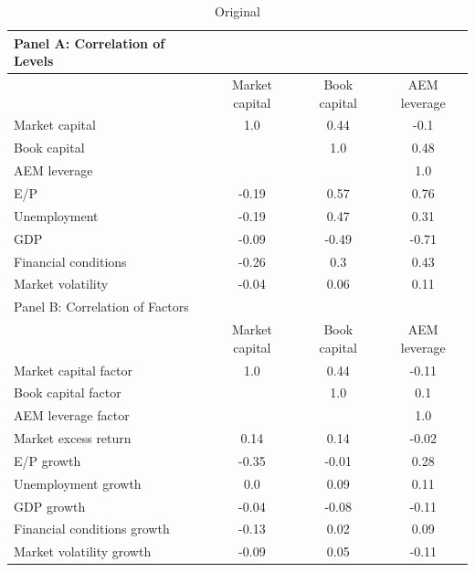 \documentclass{article}
\begin{document}
\clearpage


    \begin{table}[htbp]
    \centering
    \caption{\label{tab:correlation}Original}
    \begin{adjustbox}{max width=\textwidth}
    \small
    \begin{tabular}{lccc}
        \toprule
        Panel A: Correlation of Levels \\
        \midrule
         & Market capital & Book capital & AEM leverage \\
        \midrule
        Market capital & 1.0 & 0.44 & -0.1 \\
Book capital &  & 1.0 & 0.48 \\
AEM leverage &  &  & 1.0 \\
E/P & -0.19 & 0.57 & 0.76 \\
Unemployment & -0.19 & 0.47 & 0.31 \\
GDP & -0.09 & -0.49 & -0.71 \\
Financial conditions & -0.26 & 0.3 & 0.43 \\
Market volatility & -0.04 & 0.06 & 0.11 \\
        \midrule
        Panel B: Correlation of Factors \\
        \midrule
         & Market capital & Book capital & AEM leverage \\
        \midrule
        Market capital factor & 1.0 & 0.44 & -0.11 \\
Book capital factor &  & 1.0 & 0.1 \\
AEM leverage factor &  &  & 1.0 \\
Market excess return & 0.14 & 0.14 & -0.02 \\
E/P growth & -0.35 & -0.01 & 0.28 \\
Unemployment growth & 0.0 & 0.09 & 0.11 \\
GDP growth & -0.04 & -0.08 & -0.11 \\
Financial conditions growth & -0.13 & 0.02 & 0.09 \\
Market volatility growth & -0.09 & 0.05 & -0.11 \\
        \bottomrule
    \end{tabular}
    \end{adjustbox}
    \end{table}
    
\end{document}
